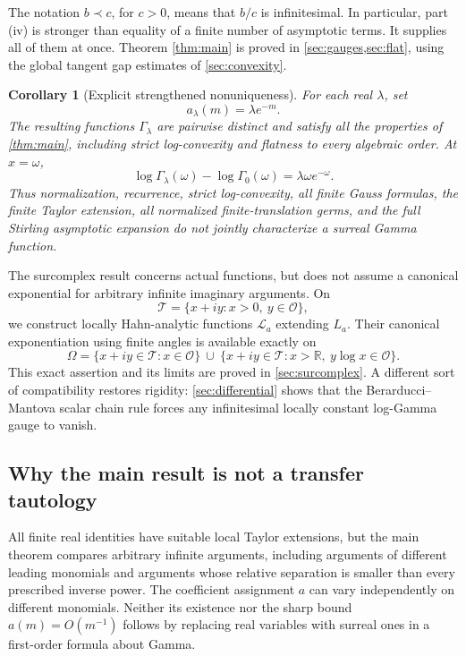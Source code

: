 \documentclass[11pt,letterpaper]{article}
\numberwithin{equation}{section}
\theoremstyle{plain}
\newtheorem{corollary}[corollary]{Corollary}
\theoremstyle{definition}
\theoremstyle{remark}
\newcommand{\R}{\mathbb R}
\newcommand{\Ocal}{\mathcal O}
\newcommand{\tube}{\mathcal T}
\newcommand{\Lt}{\mathcal L}
\begin{document}
The notation $b\prec c$, for $c>0$, means that $b/c$ is infinitesimal.
In particular, part (iv) is stronger than equality of a finite number of
asymptotic terms. It supplies all of them at once. Theorem
\ref{thm:main} is proved in \cref{sec:gauges,sec:flat}, using the global tangent
gap estimates of \cref{sec:convexity}.

\begin{corollary}[Explicit strengthened nonuniqueness]\label{cor:headline}
For each real $\lambda$, set
\begin{equation}\label{eq:explicit-gauge}
 a_\lambda(m)=\lambda e^{-m}.
\end{equation}
The resulting functions $\Gamma_\lambda$ are pairwise distinct and satisfy
all the properties of \cref{thm:main}, including strict log-convexity and
flatness to every algebraic order. At $x=\omega$,
\begin{equation}\label{eq:omega-value}
 \log\Gamma_\lambda(\omega)-\log\Gamma_0(\omega)
 =\lambda\omega e^{-\omega}.
\end{equation}
Thus normalization, recurrence, strict log-convexity, all finite Gauss
formulas, the finite Taylor extension, all normalized finite-translation
germs, and the full Stirling asymptotic expansion do not jointly characterize
a surreal Gamma function.
\end{corollary}

The surcomplex result concerns actual functions, but does not assume a
canonical exponential for arbitrary infinite imaginary arguments. On
\[
 \tube=\{x+iy:x>0,\ y\in\Ocal\},
\]
we construct locally Hahn-analytic functions $\Lt_a$ extending $L_a$.
Their canonical exponentiation using finite angles is available exactly on
\begin{equation}\label{eq:omega-domain-intro}
 \Omega=\{x+iy\in\tube:x\in\Ocal\}
 \ \cup\
 \{x+iy\in\tube:x>\R,\ y\log x\in\Ocal\}.
\end{equation}
This exact assertion and its limits are proved in
\cref{sec:surcomplex}. A different sort of compatibility restores rigidity:
\cref{sec:differential} shows that the Berarducci--Mantova scalar chain rule
forces any infinitesimal locally constant log-Gamma gauge to vanish.

\subsection{Why the main result is not a transfer tautology}
All finite real identities have suitable local Taylor extensions, but the
main theorem compares arbitrary infinite arguments, including arguments of
different leading monomials and arguments whose relative separation is
smaller than every prescribed inverse power. The coefficient assignment $a$
can vary independently on different monomials. Neither its existence nor the
sharp bound $a(m)=O(m^{-1})$ follows by replacing real variables with surreal
ones in a first-order formula about Gamma.
\end{document}
